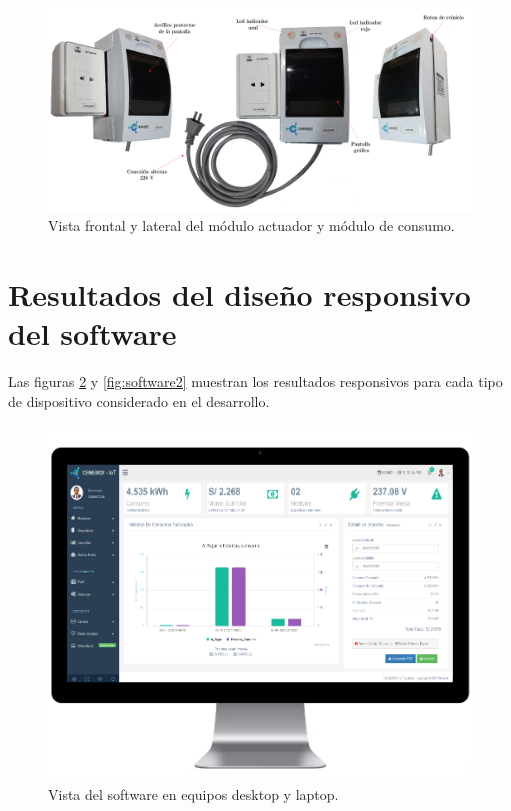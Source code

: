 
\begin{landscape} %
\begin{figure}[htpb]
\centering 
\includegraphics[width=1.8\textwidth]{./Figures/consumo3.png}
\caption{Vista frontal y lateral del módulo actuador y módulo de consumo.}
\label{fig:modConsumo2}
\end{figure}
\end{landscape} %


\section{Resultados del diseño responsivo del software}

Las figuras \ref{fig:software1} y \ref{fig:software2} muestran los resultados responsivos para cada tipo de dispositivo considerado en el desarrollo.


\begin{figure}[htpb]
\centering 
\includegraphics[width=0.62 \textwidth]{./Figures/responsive1.png}
\caption{Vista del software en equipos desktop y laptop.}
\label{fig:software1}
\end{figure}

